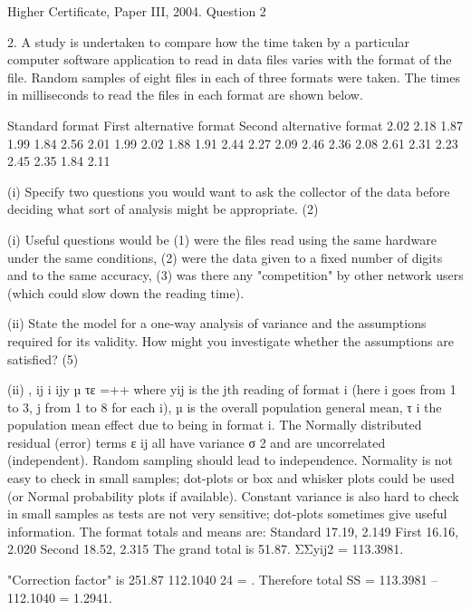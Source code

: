 \documentclass[a4paper,12pt]{article}
\begin{document}
Higher Certificate, Paper III, 2004.  Question 2 
\begin{framed}
2. A study is undertaken to compare how the time taken by a particular computer software application to read in data files varies with the format of the file.  Random samples of eight files in each of three formats were taken.  The times in milliseconds to read the files in each format are shown below. 
 
Standard format First alternative format 
Second alternative format 2.02 2.18 1.87 1.99 1.84 2.56 2.01 1.99 2.02 1.88 1.91 2.44 2.27 2.09 2.46 2.36 2.08 2.61 2.31 2.23 2.45 2.35 1.84 2.11 
 
 
(i) Specify two questions you would want to ask the collector of the data before deciding what sort of analysis might be appropriate. (2) 
\end{framed}



(i) Useful questions would be (1) were the files read using the same hardware under the same conditions, (2) were the data given to a fixed number of digits and to the same accuracy, (3) was there any "competition" by other network users (which could slow down the reading time). 


\newpage

\begin{framed}
(ii) State the model for a one-way analysis of variance and the assumptions required for its validity.  How might you investigate whether the assumptions are satisfied? (5) 
\end{framed}
 
(ii) , ij i ijy µ τε =++ where yij is the jth reading of format i (here i goes from 1 to 3, j from 1 to 8 for each i), µ is the overall population general mean, τ i the population mean effect due to being in format i.  The Normally distributed residual (error) terms ε ij all have variance σ 2 and are uncorrelated (independent).  Random sampling should lead to independence.  Normality is not easy to check in small samples;  dot-plots or box and whisker plots could be used (or Normal probability plots if available).  Constant variance is also hard to check in small samples as tests are not very sensitive;  dot-plots sometimes give useful information. 
 The format totals and means are: Standard 17.19, 2.149  First 16.16, 2.020  Second 18.52, 2.315 
 The grand total is 51.87.    ΣΣyij2 = 113.3981. 
 
"Correction factor" is 
251.87 112.1040 24 = . 
 Therefore total SS = 113.3981 – 112.1040 = 1.2941. 
 
\end{document}
